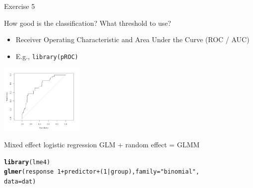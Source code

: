 \documentclass{beamer}\usepackage[]{graphicx}\usepackage[]{color}
\makeatletter
\newcommand{\hlnum}[1]{\textcolor[rgb]{0.686,0.059,0.569}{#1}}%
\newcommand{\hlstr}[1]{\textcolor[rgb]{0.192,0.494,0.8}{#1}}%
\newcommand{\hlopt}[1]{\textcolor[rgb]{0,0,0}{#1}}%
\newcommand{\hlstd}[1]{\textcolor[rgb]{0.345,0.345,0.345}{#1}}%
\newcommand{\hlkwc}[1]{\textcolor[rgb]{0.333,0.667,0.333}{#1}}%
\newcommand{\hlkwd}[1]{\textcolor[rgb]{0.737,0.353,0.396}{\textbf{#1}}}%
\newenvironment{kframe}{%
 \def\at@end@of@kframe{}%
 \ifinner\ifhmode%
  \def\at@end@of@kframe{\end{minipage}}%
  \begin{minipage}{\columnwidth}%
 \fi\fi%
 \def\FrameCommand##1{\hskip\@totalleftmargin \hskip-\fboxsep
 \colorbox{shadecolor}{##1}\hskip-\fboxsep
     \hskip-\linewidth \hskip-\@totalleftmargin \hskip\columnwidth}%
 \MakeFramed {\advance\hsize-\width
   \@totalleftmargin\z@ \linewidth\hsize
   \@setminipage}}%
 {\par\unskip\endMakeFramed%
 \at@end@of@kframe}
\newenvironment{knitrout}{}{} %
\makeatother
\begin{document}
 \begin{frame}{Exercise 5 }
 
 \pause
 
 \begin{exampleblock}{How good is the classification? What threshold to use?}
   \begin{itemize}
     \item Receiver Operating Characteristic and Area Under the Curve (ROC / AUC)
     \item E.g., \texttt{library(pROC)}
   \end{itemize}
   \includegraphics[width=0.3\textwidth]{figure/rocplot-1}
 \end{exampleblock}
%
 \end{frame}


\begin{frame}[fragile]{Mixed effect logistic regression}
GLM + random effect = GLMM\\
\pause
\begin{knitrout}\small
{}\color{fgcolor}\begin{kframe}
\begin{alltt}
\hlkwd{library}\hlstd{(lme4)}
\hlkwd{glmer}\hlstd{(response} \hlopt{~} \hlnum{1} \hlopt{+} \hlstd{predictor} \hlopt{+} \hlstd{(}\hlnum{1}\hlopt{|}\hlstd{group),} \hlkwc{family}\hlstd{=}\hlstr{"binomial"}\hlstd{,}
          \hlkwc{data}\hlstd{=dat)}
\end{alltt}
\end{kframe}
\end{knitrout}

\end{frame}
\end{document}

